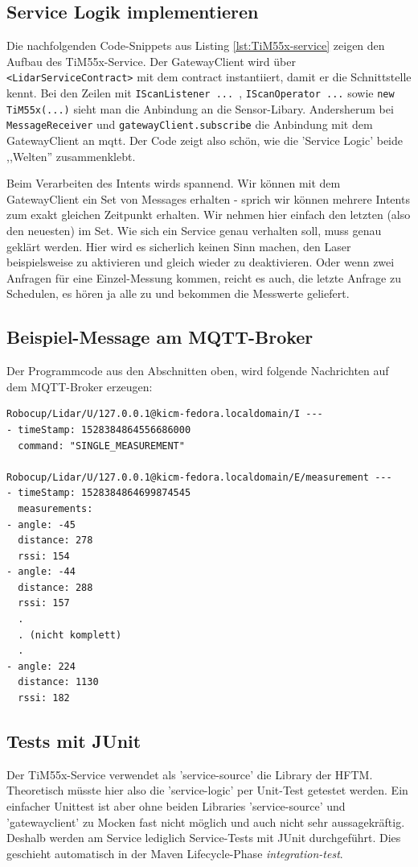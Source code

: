 \subsection{Service Logik implementieren}
Die nachfolgenden Code-Snippets aus Listing \ref{lst:TiM55x-service} zeigen den Aufbau des TiM55x-Service. Der GatewayClient wird über \verb|<LidarServiceContract>| mit dem \Gls{contract} instantiiert, damit er die Schnittstelle kennt. Bei den Zeilen mit \verb|IScanListener ... |, \verb|IScanOperator ...| sowie \verb|new TiM55x(...)| sieht man die Anbindung an die Sensor-Libary. Andersherum bei \verb|MessageReceiver| und \verb|gatewayClient.subscribe| die Anbindung mit dem GatewayClient an \acrshort{mqtt}. Der Code zeigt also schön, wie die 'Service Logic' beide ,,Welten'' zusammenklebt.



Beim Verarbeiten des Intents wirds spannend. Wir können mit dem GatewayClient ein Set von Messages erhalten - sprich wir können mehrere Intents zum exakt gleichen Zeitpunkt erhalten. Wir nehmen hier einfach den letzten (also den neuesten) im Set. Wie sich ein Service genau verhalten soll, muss genau geklärt werden. Hier wird es sicherlich keinen Sinn machen, den Laser beispielsweise zu aktivieren und gleich wieder zu deaktivieren. Oder wenn zwei Anfragen für eine Einzel-Messung kommen, reicht es auch, die letzte Anfrage zu Schedulen, es hören ja alle zu und bekommen die Messwerte geliefert.

\subsection{Beispiel-Message am MQTT-Broker}
Der Programmcode aus den Abschnitten oben, wird folgende Nachrichten auf dem MQTT-Broker erzeugen:
\begin{lstlisting}
Robocup/Lidar/U/127.0.0.1@kicm-fedora.localdomain/I ---
- timeStamp: 1528384864556686000
  command: "SINGLE_MEASUREMENT"

Robocup/Lidar/U/127.0.0.1@kicm-fedora.localdomain/E/measurement ---
- timeStamp: 1528384864699874545
  measurements:
- angle: -45
  distance: 278
  rssi: 154
- angle: -44
  distance: 288
  rssi: 157
  .
  . (nicht komplett)
  .
- angle: 224
  distance: 1130
  rssi: 182
\end{lstlisting}

\subsection{Tests mit JUnit}
Der TiM55x-Service verwendet als '\Gls{service-source}' die Library der HFTM. Theoretisch müsste hier also die '\Gls{service-logic}' per Unit-Test getestet werden. Ein einfacher Unittest ist aber ohne beiden Libraries '\Gls{service-source}' und '\Gls{gatewayclient}' zu Mocken fast nicht möglich und auch nicht sehr aussagekräftig. Deshalb werden am Service lediglich Service-Tests mit JUnit durchgeführt. Dies geschieht automatisch in der Maven Lifecycle-Phase \textit{integration-test}.
